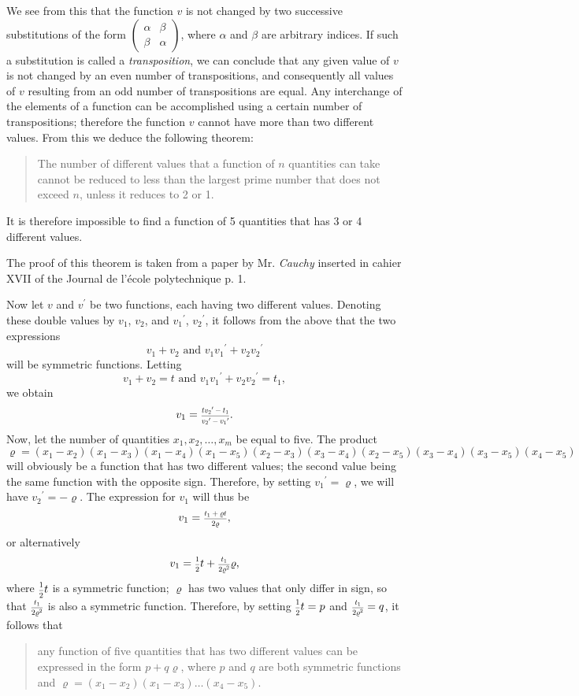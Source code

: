 \documentclass[oneside, 12 pt, leqno]{memoir}
\let\oldfrac\frac
\def\frac#1#2{\mathchoice{\text{\scalebox{.83}{${\oldfrac{#1}{#2}}$}}}{\text{\scalebox{.83}{${\displaystyle\oldfrac{#1}{#2}}$}}}{\genfrac{}{}{}{2}{#1}{#2}}{\genfrac{}{}{}{3}{#1}{#2}}}
\begin{document}
We see from this that the function \(v\) is not changed by two successive substitutions of the form \(\left(\begin{array}{cc}\alpha & \beta \\ \beta & \alpha\end{array}\right)\), where \(\alpha\) and \(\beta\) are arbitrary indices. If such a substitution is called a \textit{transposition}, we can conclude that any given value of \(v\) is not changed by an even number of transpositions, and consequently all values of \(v\) resulting from an odd number of transpositions are equal. Any interchange of the elements of a function can be accomplished using a certain number of transpositions; therefore the function \(v\) cannot have more than two different values. From this we deduce the following theorem:
\begin{quote}The number of different values that a function of \(n\) quantities can take cannot be reduced to less than the largest prime number that does not exceed \(n\), unless it reduces to 2 or 1.\end{quote}

It is therefore impossible to find a function of 5 quantities that has 3 or 4 different values.

The proof of this theorem is taken from a paper by Mr. \textit{Cauchy} inserted in cahier XVII of the Journal de l'école polytechnique p. 1.

Now let \(v\) and \(v^{\prime}\) be two functions, each having two different values.  Denoting these double values by \(v_1\), \(v_2\), and \({v_1}^{\prime}\), \({v_2}^{\prime}\), it follows from the above that the two expressions
\[v_1+v_2 \text{ and } v_1 {v_1}^{\prime}+v_2 {v_2}^{\prime}\]
will be symmetric functions. Letting
\[v_1+v_2=t \text{ and } v_1 {v_1}^{\prime}+v_2 {v_2}^{\prime}=t_1,\]
we obtain
\[v_1=\frac{t {v_2}^{\prime}-t_1}{{v_2}^{\prime}-{v_1}^{\prime}}.\]
Now, let the number of quantities \(x_1, x_2, \dots, x_m\) be equal to five.  The product
\[\varrho=(x_1-x_2)(x_1-x_3)(x_1-x_4)(x_1-x_5)(x_2-x_3)(x_3-x_4)(x_2-x_5)(x_3-x_4)(x_3-x_5)(x_4-x_5)\]
will obviously be a function that has two different values; the second value being the same function with the opposite sign. Therefore, by setting \({v_1}^{\prime}=\varrho\), we will have \({v_2}^{\prime}=-\varrho\). The expression for \(v_1\) will thus be
\[v_1=\frac{t_1+\varrho t}{2 \varrho},\]
or alternatively
\[v_1=\frac{1}{2} t+\frac{t_1}{2 \varrho^2} \varrho,\]
where \(\frac{1}{2} t\) is a symmetric function; \(\varrho\) has two values that only differ in sign, so that \(\frac{t_1}{2 \varrho^2}\) is also a symmetric function.
Therefore, by setting \(\frac{1}{2} t=p\) and \(\frac{t_1}{2 \varrho^2}=q\), it follows that
\begin{quote}any function of five quantities that has two different values can be expressed in the form \(p+q \varrho\), where \(p\) and \(q\) are both symmetric functions and \(\varrho=\left(x_1-x_2\right)\left(x_1-x_3\right) \dots\left(x_4-x_5\right)\).\end{quote}
\end{document}
